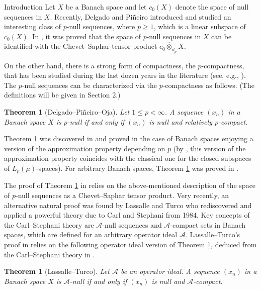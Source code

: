 \documentclass[a4paper,11pt]{amsart}
\newtheorem{thm}[prop]{Theorem}
\theoremstyle{definition}
\theoremstyle{definition}
\theoremstyle{definition}
\begin{document}
\begin{section}{Introduction}
Let $X$ be a Banach space and let $c_0(X)$ denote the space of null sequences in $X$. Recently, Delgado and Pi\~neiro \cite{PD} introduced and studied an interesting class of $p$-null sequences, where $p\geq 1$, which is a linear subspace of $c_0(X)$. In \cite{O-JF}, it was proved that the space of $p$-null sequences in $X$ can be identified with the Chevet--Saphar tensor product $c_0 \hat{\otimes}_{d_p}X$.

On the other hand, there is a strong form of compactness, the $p$-compact\-ness, that has been studied during the last dozen  years in the literature (see, e.g., \cite{ALO, AMR, CK, DOPS, DPS1, GLT, P2, SK1}). The $p$-null sequences can be characterized via the $p$-compactness as follows. (The definitions will be given in Section 2.)

\begin{thm}[Delgado--Pi\~neiro--Oja]\label{DPO}
Let $1\leq p < \infty$. A sequence $(x_n)$ in a Banach space $X$ is $p$-null if and only if $(x_n)$ is null and relatively $p$-compact.
\end{thm}

Theorem \ref{DPO} was discovered in \cite[Proposition 2.6]{PD} and proved in the case of Banach spaces enjoying a version of the approximation property depending on $p$ (by \cite{O-JM}, this version of the approximation property coincides with the classical one for the closed subspaces of $L_p(\mu)$-spaces). For arbitrary Banach spaces, Theorem \ref{DPO} was proved in \cite{O-JF}.

The proof of Theorem \ref{DPO} in \cite{O-JF} relies on the above-mentioned description of the space of $p$-null sequences as a Chevet--Saphar tensor product. Very recently, an alternative natural proof was found by Lassalle and Turco \cite{LT} who rediscovered and applied a powerful theory due to Carl and Stephani \cite{CS} from 1984. Key concepts of the Carl--Stephani theory are ${{\mathcal A}}$-null sequences and ${{\mathcal A}}$-compact sets in Banach spaces, which are defined for an arbitrary operator ideal ${{\mathcal A}}$. Lassalle--Turco's proof in \cite{LT} relies on the following operator ideal version of Theorem \ref{DPO}, deduced from the Carl--Stephani theory in \cite[Proposition 1.4]{LT}.

\begin{thm}[Lassalle--Turco]\label{LT}
Let ${{\mathcal A}}$ be an operator ideal. A sequence $(x_n)$ in a Banach space $X$ is ${{\mathcal A}}$-null if and only if $(x_n)$ is null and  ${{\mathcal A}}$-compact.
\end{thm}


\end{section}
\end{document}
